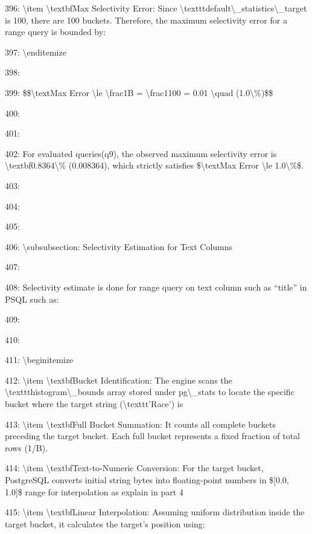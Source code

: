 \documentclass[11pt,a4paper]{article}
\begin{document}
{396: \textbackslash{}item \textbackslash{}textbf{Max Selectivity Error}: Since \textbackslash{}texttt{default\textbackslash{}\_statistics\textbackslash{}\_target} is 100, there are 100 buckets. Therefore, the maximum selectivity error for a range query is bounded by:

397: \textbackslash{}end{itemize}

398:

399: \$\$\textbackslash{}text{Max Error} \textbackslash{}le \textbackslash{}frac{1}{B} = \textbackslash{}frac{1}{100} = 0.01 \textbackslash{}quad (1.0\textbackslash{}\%)\$\$

400:

401:

402: For evaluated queries(q9), the observed maximum selectivity error is \textbackslash{}textbf{0.8364\textbackslash{}\%} (0.008364), which strictly satisfies \$\textbackslash{}text{Max Error} \textbackslash{}le 1.0\textbackslash{}\%\$.

403:

404:

405:

406: \textbackslash{}subsubsection{: Selectivity Estimation for Text Columns}

407:

408: Selectivity estimate is done for range query on text column such as “title” in PSQL such as:

409:

410:

411: \textbackslash{}begin{itemize}

412: \textbackslash{}item \textbackslash{}textbf{Bucket Identification:} The engine scans the \textbackslash{}texttt{histogram\textbackslash{}\_bounds} array stored under pg\textbackslash{}\_stats to locate the specific bucket where the target string (\textbackslash{}texttt{'Race'})  is

413: \textbackslash{}item \textbackslash{}textbf{Full Bucket Summation:} It counts all complete buckets preceding the target bucket. Each full bucket represents a fixed fraction of total rows (1/B).

414: \textbackslash{}item \textbackslash{}textbf{Text-to-Numeric Conversion:} For the target bucket, PostgreSQL converts initial string bytes into floating-point numbers in \$[0.0, 1.0]\$ range for interpolation as explain in part 4

415: \textbackslash{}item \textbackslash{}textbf{Linear Interpolation:} Assuming uniform distribution inside the target bucket, it calculates the target's position using:

}
\end{document}

